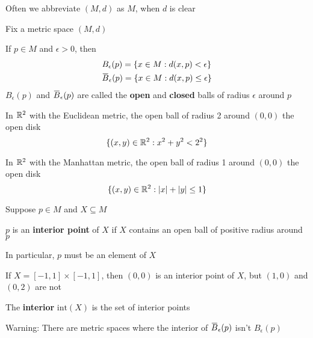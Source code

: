 \documentclass[11pt]{article}
\def \tint {\text{int}}
\begin{document}
Often we abbreviate \((M,d)\) as \(M\), when \(d\) is clear

Fix a metric space \((M,d)\)

\begin{definition}[]
If \(p\in M\) and \(\epsilon>0\), then
\begin{align*}
&B_\epsilon(p)=\{x\in M:d(x,p)<\epsilon\}\\
&\barB_\epsilon(p)=\{x\in M:d(x,p)\le\epsilon\}\\
\end{align*}
\(B_\epsilon(p)\) and \(\barB_\epsilon(p)\) are called the \textbf{open} and \textbf{closed} balls of radius \(\epsilon\) around \(p\)
\end{definition}

\begin{examplle}[]
In \(\mathbb{R}^2\) with the Euclidean metric, the open ball of radius 2 around \((0,0)\) the open disk
\begin{equation*}
\{(x,y)\in\mathbb{R}^2:x^2+y^2<2^2\}
\end{equation*}
\end{examplle}

\begin{examplle}[]
In \(\mathbb{R}^2\) with the Manhattan metric, the open ball of radius 1 around \((0,0)\) the open disk
\begin{equation*}
\{(x,y)\in\R^2:\abs{x}+\abs{y}\le 1\}
\end{equation*}
\end{examplle}

Suppose \(p\in M\) and \(X\subseteq M\)
\begin{definition}[]
\(p\) is an \textbf{interior point} of \(X\) if \(X\) contains an open ball of positive radius around \(p\)
\end{definition}

In particular, \(p\) must be an element of \(X\)


\begin{examplle}[]
If \(X=[-1,1]\times[-1,1]\), then \((0,0)\) is an interior point of \(X\), but \((1,0)\)
and \((0,2)\) are not
\end{examplle}

\begin{definition}[]
The \textbf{interior} \(\tint(X)\) is the set of interior points
\end{definition}

Warning: There are metric spaces where the interior of \(\barB_\epsilon(p)\) isn't \(B_\epsilon(p)\)
\end{document}
